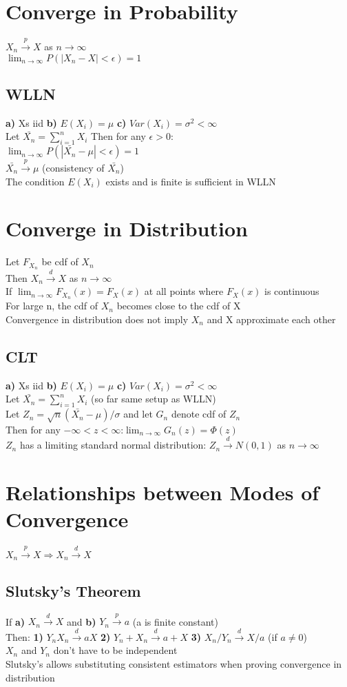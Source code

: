 \documentclass{article}
\newcommand{\cd}{\overset{d}{\to}}
\newcommand{\cp}{\overset{p}{\to}}
\newcommand{\limn}{\lim_{n\to \infty}}
\newcommand{\sg}{\sigma}
\newcommand{\sumn}{\sum_{i=1}^{n}}
\newcommand{\bxn}{\bar{X_n}}
\newcommand{\ra}{\Rightarrow}
\begin{document}
\begin{flushleft}
\section*{Converge in Probability}
$X_n\cp X$ as $n\to \infty$\\
$\limn P(|X_n-X|<\epsilon)=1$
\subsection*{WLLN}
\textbf{a)} Xs iid \quad \textbf{b)} $E(X_i)=\mu$ \quad \textbf{c)} $Var(X_i)=\sg^2<\infty$\\
Let $\bar{X_n} = \sumn X_i$ Then for any $\epsilon>0$:\\
$\limn P(|\bar{X_n}-\mu|<\epsilon)=1$\\
$\bar{X_n}\cp \mu$ (consistency of $\bar{X_n}$)\\
The condition $E(X_i)$ exists and is finite is sufficient in WLLN
\section*{Converge in Distribution}
Let $F_{X_n}$ be cdf of $X_n$\\
Then $X_n\cd X$ as $n\to \infty$\\ 
If $\limn F_{X_n}(x)=F_X(x)$ at all points where $F_X(x)$ is continuous\\
For large n, the cdf of $X_n$ becomes close to the cdf of X\\
Convergence in distribution does not imply $X_n$ and X approximate each other
\subsection*{CLT}
\textbf{a)} Xs iid \quad \textbf{b)} $E(X_i)=\mu$ \quad \textbf{c)} $Var(X_i)=\sg^2<\infty$\\
Let $\bar{X_n} = \sumn X_i$ (so far same setup as WLLN)\\
Let $Z_n=\sqrt{n}(\bxn-\mu)/\sg$ and let $G_n$ denote cdf of $Z_n$\\
Then for any $-\infty<z<\infty$:\quad $\limn G_n(z)=\Phi(z)$\\
$Z_n$ has a limiting standard normal distribution: $Z_n\cd N(0,1)$ as $n\to \infty$
\section*{Relationships between Modes of Convergence}
$X_n\cp X \ra X_n\cd X$
\subsection*{Slutsky's Theorem}
If \textbf{a)} $X_n\cd X$ and \textbf{b)} $Y_n\cp a$ (a is finite constant)\\
Then: \textbf{1)} $Y_nX_n\cd aX$ \quad \textbf{2)} $Y_n+X_n\cd a+X$ \quad \textbf{3)} $X_n/Y_n\cd X/a$ (if $a\neq 0$)\\
$X_n$ and $Y_n$ don't have to be independent\\
Slutsky's allows substituting consistent estimators when proving convergence in distribution

\end{flushleft}
\end{document}
